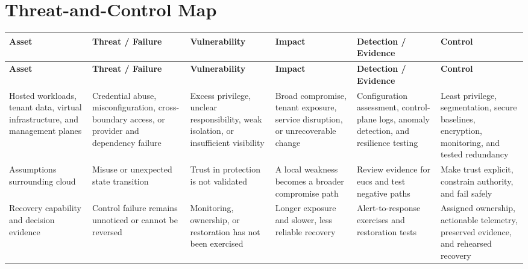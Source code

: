 \documentclass[11pt]{article}
\begin{document}
\section*{Threat-and-Control Map}
\begingroup\scriptsize\setlength{\tabcolsep}{2pt}
\begin{longtable}{>{\RaggedRight\arraybackslash}p{}>{\RaggedRight\arraybackslash}p{}>{\RaggedRight\arraybackslash}p{}>{\RaggedRight\arraybackslash}p{}>{\RaggedRight\arraybackslash}p{}>{\RaggedRight\arraybackslash}p{}}
\toprule\rowcolor{Navy}\color{white}\textbf{Asset} & \color{white}\textbf{Threat / Failure} & \color{white}\textbf{Vulnerability} & \color{white}\textbf{Impact} & \color{white}\textbf{Detection / Evidence} & \color{white}\textbf{Control}\\\midrule
\endfirsthead
\toprule\rowcolor{Navy}\color{white}\textbf{Asset} & \color{white}\textbf{Threat / Failure} & \color{white}\textbf{Vulnerability} & \color{white}\textbf{Impact} & \color{white}\textbf{Detection / Evidence} & \color{white}\textbf{Control}\\\midrule
\endhead
Hosted workloads, tenant data, virtual infrastructure, and management planes & Credential abuse, misconfiguration, cross-boundary access, or provider and dependency failure & Excess privilege, unclear responsibility, weak isolation, or insufficient visibility & Broad compromise, tenant exposure, service disruption, or unrecoverable change & Configuration assessment, control-plane logs, anomaly detection, and resilience testing & Least privilege, segmentation, secure baselines, encryption, monitoring, and tested redundancy\\\midrule
Assumptions surrounding cloud & Misuse or unexpected state transition & Trust in protection is not validated & A local weakness becomes a broader compromise path & Review evidence for eucs and test negative paths & Make trust explicit, constrain authority, and fail safely\\\midrule
Recovery capability and decision evidence & Control failure remains unnoticed or cannot be reversed & Monitoring, ownership, or restoration has not been exercised & Longer exposure and slower, less reliable recovery & Alert-to-response exercises and restoration tests & Assigned ownership, actionable telemetry, preserved evidence, and rehearsed recovery\\\midrule
\bottomrule
\end{longtable}
\endgroup
\end{document}
